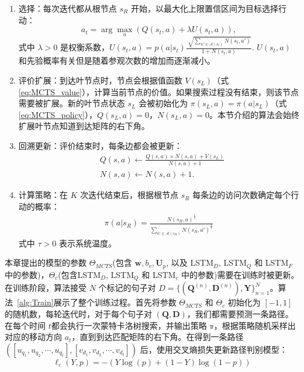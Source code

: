 \begin{enumerate}
	\item 选择：每次迭代都从根节点 $s_R$ 开始，以最大化上限置信区间为目标选择行动：
\begin{equation}\label{eq:Selection}
  a_t = \arg\max_a (Q(s_t, a) + \lambda U(s_t, a)),
\end{equation}
式中 $\lambda >0$ 是权衡系数，$U(s_t, a) =  p(a|s_t)\frac{\sqrt[]{\sum_{a'\in\mathcal{A}(s_t)} N(s_t, a')}}{1 + N(s_t, a)}$. $U(s_t, a)$ 和先验概率有关但是随着参观次数的增加而逐渐减小。

	\item 评价扩展：到达叶节点时，节点会根据值函数 $V(s_L)$（式\ref{eq:MCTS_value}），计算当前节点的价值。如果搜索过程没有结束，则该节点需要被扩展。新的叶节点状态 $s_L$ 会被初始化为 $\pi(s_L,a) = \pi(a|s_L)$（式\ref{eq:MCTS_policy}），$Q(s_L,a) = 0$，$N(s_L,a) = 0$。本节介绍的算法会始终扩展叶节点知道到达矩阵的右下角。

	\item 回溯更新：评价结束时，每条边都会被更新：
\begin{equation}
\label{eq:back update}
\begin{aligned}
	&Q(s, a) \leftarrow  \frac{Q(s, a) \times N(s, a) + V(s_L)}{N(s, a) + 1}\\
 	&N(s, a) \leftarrow  N(s, a) + 1.
\end{aligned}
\end{equation}

	\item 计算策略：在 $K$ 次迭代结束后，根据根节点 $s_R$ 每条边的访问次数确定每个行动的概率：
	\begin{equation}
\label{eq:SearchProb}
\begin{aligned}
	\pi(a|s_R) = \frac{N(s_R, a)^{\frac{1}{\tau}}}{\sum_{a'\in\mathcal{A}(s_R)} N(s_R, a')^{\frac{1}{\tau}}}
\end{aligned}
\end{equation}
式中 $\tau>0$ 表示系统温度。
\end{enumerate}


本章提出的模型的参数 $\Theta_{MCTS}$(包含 $\mathbf{w}, b_v, \mathbf{U}_p$, 以及 LSTM$_D$, LSTM$_Q$ 和 LSTM$_F$中的参数)，$\Theta_{c}$(包含LSTM$_D$, LSTM$_Q$ 和 LSTM$_c$ 中的参数)需要在训练时被更新。在训练阶段，算法接受 $N$ 个标记的句子对 $D = \{ (\mathbf{Q}^{(n)}, \mathbf{D}^{(n)}), \mathbf{Y}\}_{n=1}^{N}$。算法~\ref{alg:Train}展示了整个训练过程。首先将参数  $\Theta_{MCTS}$ 和 $\Theta_{c}$ 初始化为 $[-1, 1]$ 的随机数，每轮迭代时，对于每个句子对 $(\mathbf{Q}, \mathbf{D})$，我们都需要预测一条路径。在每个时间 $t$都会执行一次蒙特卡洛树搜索，并输出策略 $\mathbb{\pi}$，根据策略随机采样出对应的移动方向 $a_t$，直到到达匹配矩阵的右下角。在得到一条路径 $([u_{q_1}, u_{q_2}, \cdots, u_{q_t}], [v_{d_1}, v_{d_2}, \cdots, v_{d_t}])$ 后，使用交叉熵损失更新路径判别模型：
\begin{equation}
\label{eq:classification_loss}
\ell_c(Y, p) = -\left(Y\log(p) + (1-Y)\log (1-p)\right)
\end{equation}

